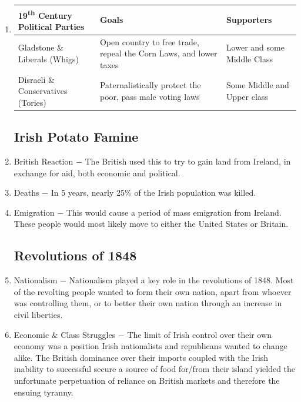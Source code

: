 \documentclass[12pt]{article}
\begin{document}
\begin{enumerate}
\item \begin{tabular}{p{} p{} p{}}
\hline
19\textsuperscript{th} Century Political Parties & Goals & Supporters \\
\hline
Gladstone \& Liberals (Whigs) & Open country to free trade, repeal the Corn Laws, and lower taxes & Lower and some Middle Class  \\
\hline
Disraeli \& Conservatives (Tories) & Paternalistically protect the poor, pass male voting laws & Some Middle and Upper class \\
\hline
\end{tabular}

\subsection{Irish Potato Famine}

\item British Reaction $-$ The British used this to try to gain land from Ireland, in exchange for aid, both economic and political. 

\item Deaths $-$ In 5 years, nearly 25\% of the Irish population was killed.

\item Emigration $-$ This would cause a period of mass emigration from Ireland. These people would most likely move to either the United States or Britain.

\subsection{Revolutions of 1848}

\item Nationalism $-$ Nationalism played a key role in the revolutions of 1848. Most of the revolting people wanted to form their own nation, apart from whoever was controlling them, or to better their own nation through an increase in civil liberties. 

\item Economic \& Class Struggles $-$ The limit of Irish control over their own economy was a position Irish nationalists and republicans wanted to change alike. The British dominance over their imports coupled with the Irish inability to successful secure a source of food for/from their island yielded the unfortunate perpetuation of reliance on British markets and therefore the ensuing tyranny.


\end{enumerate}
\end{document}

